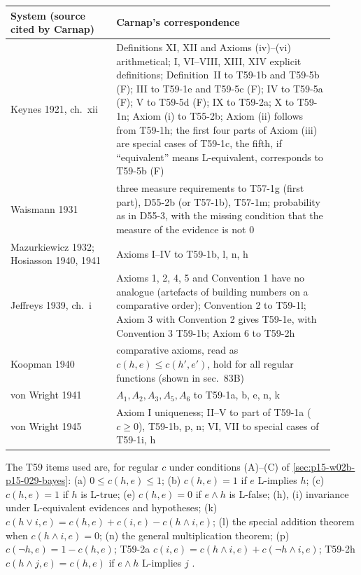 \begin{center}
\small
\begin{tabular}{@{}p{0.30\linewidth}p{0.62\linewidth}@{}}
\hline
System (source cited by Carnap) & Carnap's correspondence\\
\hline
Keynes 1921, ch.~xii & Definitions XI, XII and Axioms (iv)--(vi)
arithmetical; I, VI--VIII, XIII, XIV explicit definitions; Definition~II
to T59-1b and T59-5b (F); III to T59-1e and T59-5c (F); IV to T59-5a
(F); V to T59-5d (F); IX to T59-2a; X to T59-1n; Axiom (i) to T55-2b;
Axiom (ii) follows from T59-1h; the first four parts of Axiom (iii) are
special cases of T59-1c, the fifth, if ``equivalent'' means
L-equivalent, corresponds to T59-5b (F)\\
Waismann 1931 & three measure requirements to T57-1g (first part),
D55-2b (or T57-1b), T57-1m; probability as in D55-3, with the missing
condition that the measure of the evidence is not \(0\)\\
Mazurkiewicz 1932; Hosiasson 1940, 1941 & Axioms I--IV to T59-1b, l,
n, h\\
Jeffreys 1939, ch.~i & Axioms 1, 2, 4, 5 and Convention 1 have no
analogue (artefacts of building numbers on a comparative order);
Convention 2 to T59-1l; Axiom 3 with Convention 2 gives T59-1e, with
Convention 3 T59-1b; Axiom 6 to T59-2h\\
Koopman 1940 & comparative axioms, read as
\(c(h,e)\leq c(h',e')\), hold for all regular functions (shown in
sec.~83B)\\
von Wright 1941 & \(A_1,A_2,A_3,A_5,A_6\) to T59-1a, b, e, n, k\\
von Wright 1945 & Axiom I uniqueness; II--V to part of T59-1a
(\(c\geq0\)), T59-1b, p, n; VI, VII to special cases of T59-1i, h\\
\hline
\end{tabular}
\end{center}

The T59 items used are, for regular \(c\) under conditions (A)--(C) of
\cref{sec:p15-w02b-p15-029-bayes}: (a) \(0\leq c(h,e)\leq1\); (b)
\(c(h,e)=1\) if \(e\) L-implies \(h\); (c) \(c(h,e)=1\) if \(h\) is
L-true; (e) \(c(h,e)=0\) if \(e\land h\) is L-false; (h), (i)
invariance under L-equivalent evidences and hypotheses; (k)
\(c(h\lor i,e)=c(h,e)+c(i,e)-c(h\land i,e)\); (l) the special addition
theorem when \(c(h\land i,e)=0\); (n) the general multiplication
theorem; (p) \(c(\neg h,e)=1-c(h,e)\); T59-2a
\(c(i,e)=c(h\land i,e)+c(\neg h\land i,e)\); T59-2h \(c(h\land j,e)=c(h,e)\)
if \(e\land h\) L-implies \(j\) \cite[sec.~59, pp.~316--318]{Carnap1950Probability}.

